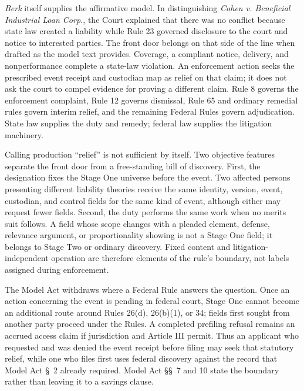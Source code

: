 \emph{Berk} itself supplies the affirmative model. In distinguishing \emph{Cohen v. Beneficial Industrial Loan Corp.}, the Court explained that there was no conflict because state law created a liability while Rule 23 governed disclosure to the court and notice to interested parties. The front door belongs on that side of the line when drafted as the model text provides. Coverage, a compliant notice, delivery, and nonperformance complete a state-law violation. An enforcement action seeks the prescribed event receipt and custodian map as relief on that claim; it does not ask the court to compel evidence for proving a different claim. Rule 8 governs the enforcement complaint, Rule 12 governs dismissal, Rule 65 and ordinary remedial rules govern interim relief, and the remaining Federal Rules govern adjudication. State law supplies the duty and remedy; federal law supplies the litigation machinery.

Calling production ``relief'' is not sufficient by itself. Two objective features separate the front door from a free-standing bill of discovery. First, the designation fixes the Stage One universe before the event. Two affected persons presenting different liability theories receive the same identity, version, event, custodian, and control fields for the same kind of event, although either may request fewer fields. Second, the duty performs the same work when no merits suit follows. A field whose scope changes with a pleaded element, defense, relevance argument, or proportionality showing is not a Stage One field; it belongs to Stage Two or ordinary discovery. Fixed content and litigation-independent operation are therefore elements of the rule's boundary, not labels assigned during enforcement.

The Model Act withdraws where a Federal Rule answers the question. Once an action concerning the event is pending in federal court, Stage One cannot become an additional route around Rules 26(d), 26(b)(1), or 34; fields first sought from another party proceed under the Rules. A completed prefiling refusal remains an accrued access claim if jurisdiction and Article III permit. Thus an applicant who requested and was denied the event receipt before filing may seek that statutory relief, while one who files first uses federal discovery against the record that Model Act \S~2 already required. Model Act \S\S~7 and 10 state the boundary rather than leaving it to a savings clause.

